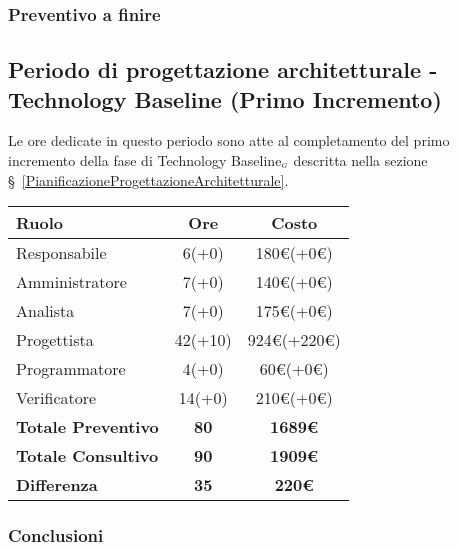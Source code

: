 {{{\subsubsection{Preventivo a finire}

\subsection{Periodo di progettazione architetturale - Technology Baseline (Primo Incremento)}\label{ConsuntivoPeriodoDiProgettazioneArchitetturaleTechnologyBaselinePrimoIncremento}

Le ore dedicate in questo periodo sono atte al completamento del primo incremento della fase di Technology Baseline$_{\scaleto{G}{3pt}}$ descritta nella sezione \S~\ref{PianificazioneProgettazioneArchitetturale}.

\quad
\def\tabularxcolumn#1{m{#1}}
{
	\begin{center}
		\renewcommand{\arraystretch}{1.4}
		\begin{tabularx}{10cm}{|X|c|c|}
			\hline
			\rowcolor{airforceblue}
			\textbf{Ruolo} & \textbf{Ore} & \textbf{Costo}\\
			\hline
			Responsabile & 6(+0) & 180\euro(+0\euro)\\
			\hline
			Amministratore & 7(+0) & 140\euro(+0\euro)\\
			\hline
			Analista & 7(+0) & 175\euro(+0\euro)\\
			\hline
			Progettista & 42(+10) & 924\euro(+220\euro)\\
			\hline
			Programmatore & 4(+0) & 60\euro(+0\euro)\\
			\hline
			Verificatore & 14(+0) & 210\euro(+0\euro)\\
			\hline
			\textbf{Totale Preventivo} & \textbf{80} & \textbf{1689\euro}\\
			\hline
			\textbf{Totale Consultivo} & \textbf{90} & \textbf{1909\euro}\\
			\hline
			\textbf{Differenza} & \textbf{35} & \textbf{220\euro}
		\end{tabularx}
	\end{center}

\subsubsection{Conclusioni}

}}}}
